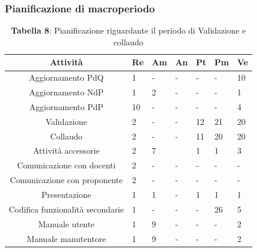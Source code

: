 \subsubsection{Pianificazione di macroperiodo}
\begin{table}[H]
	\centering
	\renewcommand{\arraystretch}{1.5}
	\begin{tabular}{|c|p{10mm}|p{10mm}|p{10mm}|p{10mm}|p{10mm}|p{10mm}|}
		\hline
		\rowcolor{lighter-grayer}
		Attività & Re & Am & An & Pt & Pm & Ve \\ \hline
		Aggiornamento PdQ                                                           & 1           &    -         &      -       &     -        &     -        & 10          \\ \hline
		Aggiornamento NdP                                                           & 1           & 2           &    -         &     -        &      -       & 1           \\ \hline
		Aggiornamento PdP                                                           & 10          &     -        &    -         &     -        &    -         & 4           \\ \hline
		Validazione                                                                 & 2           &   -          &       -      & 12          & 21          & 20          \\ \hline
		Collaudo                                                                    & 2           &     -        &     -        & 11          & 20          & 20          \\ \hline
		Attività accessorie & 2           & 7           &             & 1           & 1           & 3           \\ \hline
		Comunicazione con docenti                                                   & 2           &     -        &      -       &     -        &      -       &     -        \\ \hline
		Comunicazione con proponente                                                & 2           &    -         &       -      &   -          &     -        &    -         \\ \hline
		Presentazione                                                               & 1           & 1           &    -         & 1           & 1           & 1           \\ \hline
		Codifica funzionalità secondarie                                            & 1           &    -         &      -       &    -        & 26          & 5           \\ \hline
		Manuale utente                                                              & 1           & 9           &     -        &    -         &     -        & 2           \\ \hline
		Manuale manutentore                                                         & 1           & 9           &      -       &      -       &     -        & 2           \\ \hline
	\end{tabular}
	\caption*{\textbf{Tabella 8}: Pianificazione riguardante il periodo di Validazione e collaudo\\}
\end{table}